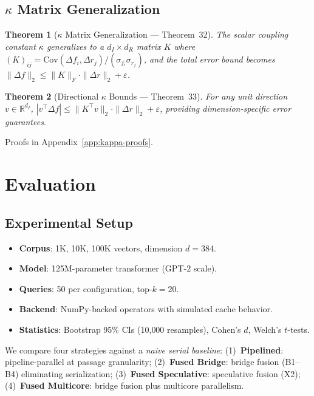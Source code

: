 \documentclass{article}
\newtheorem{theorem}{Theorem}
\theoremstyle{definition}
\theoremstyle{remark}
\begin{document}
\subsection{$\kappa$ Matrix Generalization}

\begin{theorem}[$\kappa$ Matrix Generalization --- Theorem~32]\label{thm:kappa-matrix}
The scalar coupling constant $\kappa$ generalizes to a $d_I \times d_R$ matrix $K$ where $(K)_{ij} = \mathrm{Cov}(\Delta f_i, \Delta r_j) / (\sigma_{f_i} \sigma_{r_j})$, and the total error bound becomes $\|\Delta f\|_2 \leq \|K\|_F \cdot \|\Delta r\|_2 + \varepsilon$.
\end{theorem}

\begin{theorem}[Directional $\kappa$ Bounds --- Theorem~33]\label{thm:kappa-directional}
For any unit direction $v \in \mathbb{R}^{d_I}$, $|v^\top \Delta f| \leq \|K^\top v\|_2 \cdot \|\Delta r\|_2 + \varepsilon$, providing dimension-specific error guarantees.
\end{theorem}

Proofs in Appendix~\ref{app:kappa-proofs}.

\section{Evaluation}\label{sec:eval}

\subsection{Experimental Setup}

\begin{itemize}[nosep]
  \item \textbf{Corpus}: 1K, 10K, 100K vectors, dimension $d = 384$.
  \item \textbf{Model}: 125M-parameter transformer (GPT-2 scale).
  \item \textbf{Queries}: 50 per configuration, top-$k = 20$.
  \item \textbf{Backend}: NumPy-backed operators with simulated cache behavior.
  \item \textbf{Statistics}: Bootstrap 95\% CIs (10{,}000 resamples), Cohen's $d$, Welch's $t$-tests.
\end{itemize}

We compare four strategies against a \emph{naive serial baseline}:
(1)~\textbf{Pipelined}: pipeline-parallel at passage granularity;
(2)~\textbf{Fused Bridge}: bridge fusion (B1--B4) eliminating serialization;
(3)~\textbf{Fused Speculative}: speculative fusion (X2);
(4)~\textbf{Fused Multicore}: bridge fusion plus multicore parallelism.
\end{document}

